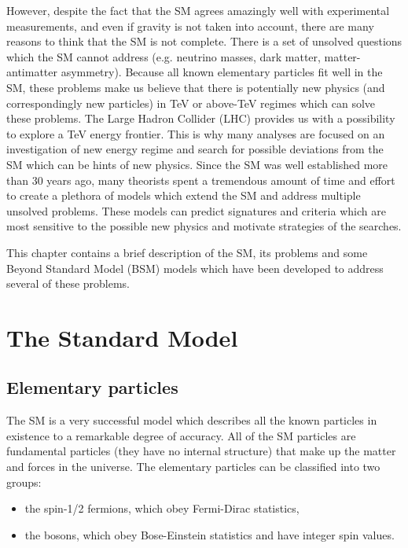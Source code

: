 However, despite the fact that the SM agrees amazingly well with experimental measurements, and even if gravity is not taken into account, 
there are many reasons to think that the SM is not complete.
There is a set of unsolved questions which the SM cannot address (e.g. neutrino masses, dark matter, matter-antimatter asymmetry).
Because all known elementary particles fit well in the SM, these problems make us believe that there is
potentially new physics (and correspondingly new particles) in TeV or above-TeV regimes which can solve these problems.
The Large Hadron Collider (LHC) provides us with a possibility to explore a TeV energy frontier.
This is why many analyses are focused on an investigation of new energy regime and search for possible deviations from the SM which can be hints of new physics.
Since the SM was well established more than 30 years ago, many theorists spent a tremendous amount of time and effort to create
a plethora of models which extend the SM and address multiple unsolved problems. These models can predict signatures and criteria which are most sensitive to the possible new physics and motivate strategies of the searches.

This chapter contains a brief description of the SM, its problems and 
some Beyond Standard Model (BSM) models which have been developed to address several of these problems.

\section{The Standard Model}

\subsection{Elementary particles}



The SM is a very successful model which describes all the known particles in existence to a remarkable degree of accuracy.
All of the SM particles are fundamental particles (they have no internal structure) that make up the matter and forces in the universe.
The elementary particles can be classified into two groups: 
\begin{itemize}
 \item the spin-1/2 fermions, which obey Fermi-Dirac statistics,
 \item the bosons, which obey Bose-Einstein statistics and have integer spin values.
\end{itemize}

